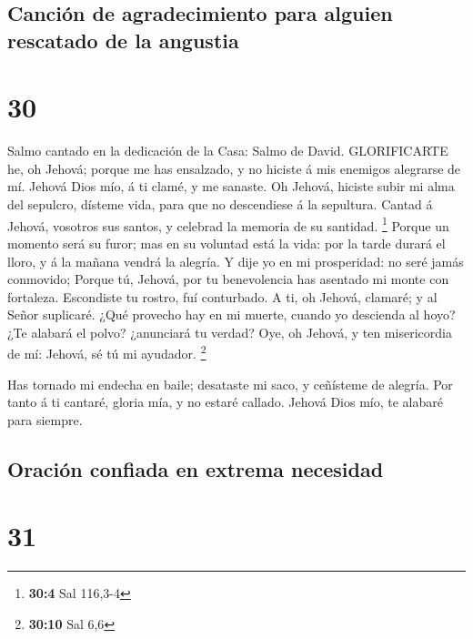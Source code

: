 \hypertarget{canciuxf3n-de-agradecimiento-para-alguien-rescatado-de-la-angustia}{%
\subsection{Canción de agradecimiento para alguien rescatado de la
angustia}\label{canciuxf3n-de-agradecimiento-para-alguien-rescatado-de-la-angustia}}

\hypertarget{section-29}{%
\section{30}\label{section-29}}

 Salmo cantado en la dedicación de la Casa: Salmo de David.
GLORIFICARTE he, oh Jehová; porque me has ensalzado, y no hiciste á mis
enemigos alegrarse de mí.  Jehová Dios mío, á ti clamé, y me
sanaste.  Oh Jehová, hiciste subir mi alma del sepulcro,
dísteme vida, para que no descendiese á la sepultura. 
Cantad á Jehová, vosotros sus santos, y celebrad la memoria de su
santidad. \footnote{\textbf{30:4} Sal 116,3-4}  Porque un
momento será su furor; mas en su voluntad está la vida: por la tarde
durará el lloro, y á la mañana vendrá la alegría.  Y dije yo
en mi prosperidad: no seré jamás conmovido;  Porque tú,
Jehová, por tu benevolencia has asentado mi monte con fortaleza.
Escondiste tu rostro, fuí conturbado.  A ti, oh Jehová,
clamaré; y al Señor suplicaré.  ¿Qué provecho hay en mi
muerte, cuando yo descienda al hoyo? ¿Te alabará el polvo? ¿anunciará tu
verdad?  Oye, oh Jehová, y ten misericordia de mí: Jehová,
sé tú mi ayudador. \footnote{\textbf{30:10} Sal 6,6}

 Has tornado mi endecha en baile; desataste mi saco, y
ceñísteme de alegría.  Por tanto á ti cantaré, gloria mía,
y no estaré callado. Jehová Dios mío, te alabaré para siempre.

\hypertarget{oraciuxf3n-confiada-en-extrema-necesidad}{%
\subsection{Oración confiada en extrema
necesidad}\label{oraciuxf3n-confiada-en-extrema-necesidad}}

\hypertarget{section-30}{%
\section{31}\label{section-30}}

